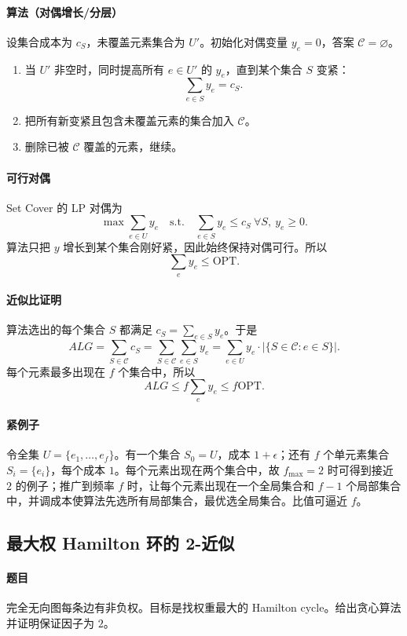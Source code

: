 \documentclass[UTF8,openany,12pt]{ctexbook}
\theoremstyle{remark}
\newcommand{\OPT}{\mathrm{OPT}}
\begin{document}
\paragraph{算法（对偶增长/分层）}
设集合成本为 $c_S$，未覆盖元素集合为 $U'$。初始化对偶变量 $y_e=0$，答案
$\mathcal C=\varnothing$。
\begin{enumerate}
  \item 当 $U'$ 非空时，同时提高所有 $e\in U'$ 的 $y_e$，直到某个集合 $S$ 变紧：
  \[
    \sum_{e\in S}y_e=c_S.
  \]
  \item 把所有新变紧且包含未覆盖元素的集合加入 $\mathcal C$。
  \item 删除已被 $\mathcal C$ 覆盖的元素，继续。
\end{enumerate}

\paragraph{可行对偶}
Set Cover 的 LP 对偶为
\[
  \max \sum_{e\in U}y_e
  \quad\text{s.t.}\quad
  \sum_{e\in S}y_e\le c_S\ \forall S,\ y_e\ge0.
\]
算法只把 $y$ 增长到某个集合刚好紧，因此始终保持对偶可行。所以
\[
  \sum_e y_e\le \OPT.
\]

\paragraph{近似比证明}
算法选出的每个集合 $S$ 都满足 $c_S=\sum_{e\in S}y_e$。于是
\[
  ALG=\sum_{S\in\mathcal C}c_S
  =\sum_{S\in\mathcal C}\sum_{e\in S}y_e
  =\sum_{e\in U} y_e\cdot |\{S\in\mathcal C:e\in S\}|.
\]
每个元素最多出现在 $f$ 个集合中，所以
\[
  ALG\le f\sum_e y_e\le f\OPT.
\]

\paragraph{紧例子}
令全集 $U=\{e_1,\dots,e_f\}$。有一个集合 $S_0=U$，成本 $1+\epsilon$；还有
$f$ 个单元素集合 $S_i=\{e_i\}$，每个成本 $1$。每个元素出现在两个集合中，故
$f_{\max}=2$ 时可得到接近 $2$ 的例子；推广到频率 $f$ 时，让每个元素出现在一个全局集合和
$f-1$ 个局部集合中，并调成本使算法先选所有局部集合，最优选全局集合。比值可逼近 $f$。

\subsection{最大权 Hamilton 环的 2-近似}

\paragraph{题目}
完全无向图每条边有非负权。目标是找权重最大的 Hamilton cycle。给出贪心算法并证明保证因子为 $2$。
\end{document}
